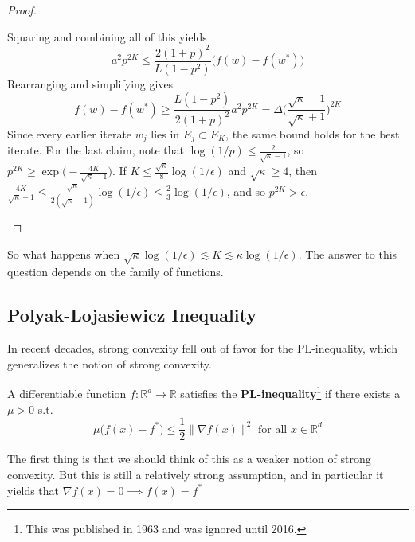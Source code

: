 \begin{proof}
\begin{enumerate}
				Squaring and combining all of this yields 
				\begin{equation}
					a^2 p^{2K} \leq \frac{2 (1 + p)^2}{L (1 - p^2)} \big( f(w) - f(w^\ast) \big) 
				\end{equation}
				Rearranging and simplifying gives 
				\begin{equation}
					f(w) - f(w^\ast) \geq \frac{L(1 - p^2)}{2 (1 + p)^2} a^2 p^{2K} = \Delta \bigg( \frac{\sqrt{\kappa} - 1}{\sqrt{\kappa} + 1} \bigg)^{2K}
				\end{equation}
				Since every earlier iterate $w_j$ lies in $E_j \subset E_K$, the same bound holds for the best iterate. For the last claim, note that $\log(1/p) \leq \frac{2}{\sqrt{\kappa} - 1}$, so $p^{2K} \geq \exp\big( -\frac{4K}{\sqrt{\kappa} - 1} \big)$. If $K \leq \frac{\sqrt{\kappa}}{8} \log(1/\epsilon)$ and $\sqrt{\kappa} \geq 4$, then $\frac{4K}{\sqrt{\kappa} - 1} \leq \frac{\sqrt{\kappa}}{2(\sqrt{\kappa} - 1)} \log(1/\epsilon) \leq \frac{2}{3} \log(1/\epsilon)$, and so $p^{2K} > \epsilon$. 
		\end{enumerate}
	\end{proof}

	So what happens when $\sqrt{\kappa} \log(1/\epsilon) \lesssim K \lesssim \kappa \log(1/\epsilon)$. The answer to this question depends on the family of functions. 

\subsection{Polyak-Lojasiewicz Inequality}

	In recent decades, strong convexity fell out of favor for the PL-inequality, which generalizes the notion of strong convexity. 

	\begin{definition}
	  \label{def:polyak-lojasiewicz-inequality}
		A differentiable function $f: \mathbb{R}^d \to \mathbb{R}$ satisfies the \textbf{PL-inequality}\footnote{This was published in 1963 and was ignored until 2016.} if there exists a $\mu > 0$ s.t. 
		\begin{equation}
			\mu \big( f(x) - f^\ast \big) \leq \frac{1}{2} \| \nabla f(x) \|^2 \text{ for all } x \in \mathbb{R}^d
		\end{equation}
	\end{definition}

	The first thing is that we should think of this as a weaker notion of strong convexity. But this is still a relatively strong assumption, and in particular it yields that $\nabla f(x) = 0 \implies f(x) = f^\ast$

